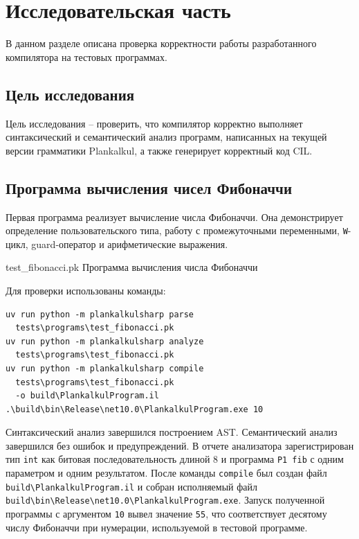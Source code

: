 \chapter{Исследовательская часть}

В данном разделе описана проверка корректности работы разработанного компилятора на тестовых программах.

\section{Цель исследования}
Цель исследования -- проверить, что компилятор корректно выполняет синтаксический и семантический анализ программ, написанных на текущей версии грамматики Plankalkul, а также генерирует корректный код CIL.

\section{Программа вычисления чисел Фибоначчи}
Первая программа реализует вычисление числа Фибоначчи.
Она демонстрирует определение пользовательского типа, работу с промежуточными переменными, \texttt{W}-цикл, guard-оператор и арифметические выражения.

{test_fibonacci.pk}
{Программа вычисления числа Фибоначчи}

Для проверки использованы команды:
\begin{verbatim}
uv run python -m plankalkulsharp parse
  tests\programs\test_fibonacci.pk
uv run python -m plankalkulsharp analyze
  tests\programs\test_fibonacci.pk
uv run python -m plankalkulsharp compile
  tests\programs\test_fibonacci.pk
  -o build\PlankalkulProgram.il
.\build\bin\Release\net10.0\PlankalkulProgram.exe 10
\end{verbatim}

Синтаксический анализ завершился построением AST.
Семантический анализ завершился без ошибок и предупреждений.
В отчете анализатора зарегистрирован тип \texttt{int} как битовая последовательность длиной 8 и программа \texttt{P1 fib} с одним параметром и одним результатом.
После команды \texttt{compile} был создан файл \texttt{build\textbackslash PlankalkulProgram.il} и собран исполняемый файл \texttt{build\textbackslash bin\textbackslash Release\textbackslash net10.0\textbackslash PlankalkulProgram.exe}.
Запуск полученной программы с аргументом \texttt{10} вывел значение \texttt{55}, что соответствует десятому числу Фибоначчи при нумерации, используемой в тестовой программе.

